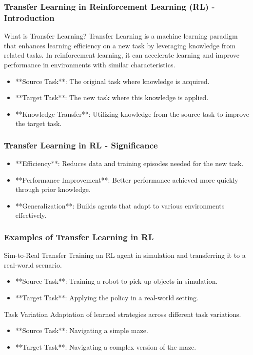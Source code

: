 \documentclass[aspectratio=169]{beamer}
\begin{document}
\begin{frame}[fragile]
  \frametitle{Transfer Learning in Reinforcement Learning (RL) - Introduction}
  \begin{block}{What is Transfer Learning?}
    Transfer Learning is a machine learning paradigm that enhances learning efficiency on a new task by leveraging knowledge from related tasks. In reinforcement learning, it can accelerate learning and improve performance in environments with similar characteristics.
  \end{block}
  
  \begin{itemize}
    \item **Source Task**: The original task where knowledge is acquired.
    \item **Target Task**: The new task where this knowledge is applied.
    \item **Knowledge Transfer**: Utilizing knowledge from the source task to improve the target task.
  \end{itemize}
\end{frame}

\begin{frame}[fragile]
  \frametitle{Transfer Learning in RL - Significance}
  \begin{itemize}
    \item **Efficiency**: Reduces data and training episodes needed for the new task.
    \item **Performance Improvement**: Better performance achieved more quickly through prior knowledge.
    \item **Generalization**: Builds agents that adapt to various environments effectively.
  \end{itemize}
\end{frame}

\begin{frame}[fragile]
  \frametitle{Examples of Transfer Learning in RL}
  \begin{block}{Sim-to-Real Transfer}
    Training an RL agent in simulation and transferring it to a real-world scenario.
    \begin{itemize}
      \item **Source Task**: Training a robot to pick up objects in simulation.
      \item **Target Task**: Applying the policy in a real-world setting.
    \end{itemize}
  \end{block}

  \begin{block}{Task Variation}
    Adaptation of learned strategies across different task variations.
    \begin{itemize}
      \item **Source Task**: Navigating a simple maze.
      \item **Target Task**: Navigating a complex version of the maze.
    \end{itemize}
  \end{block}
\end{frame}
\end{document}
